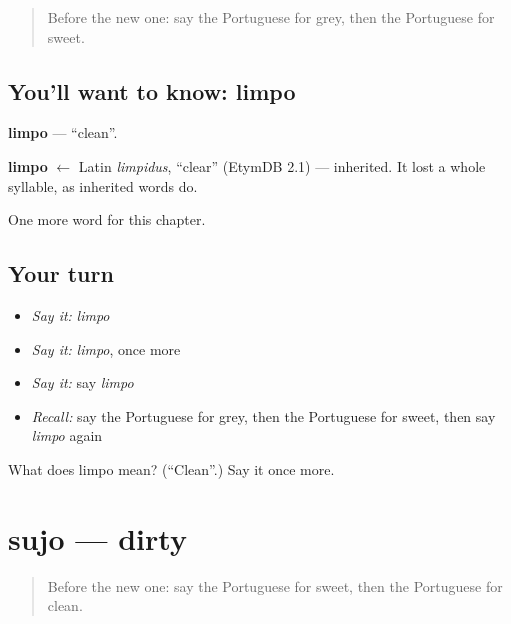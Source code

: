 \label{lesson:PT-C69-limpo}



\begin{quote}
Before the new one: say the Portuguese for grey, then the Portuguese for sweet.
\end{quote}

\subsection*{You'll want to know: limpo}
\textbf{limpo} — \textquotedblleft{}clean\textquotedblright{}.

\begin{cousinweb}
\textbf{limpo} $\leftarrow$ Latin \emph{limpidus}, \textquotedblleft{}clear\textquotedblright{} (EtymDB 2.1) — inherited. It lost a whole syllable, as inherited words do.
\end{cousinweb}

\begin{grammarlens}[title={What you've built}]
One more word for this chapter.
\end{grammarlens}

\subsection*{Your turn}
\begin{itemize}
\raggedright
  \item \emph{Say it:} \emph{limpo}
  \item \emph{Say it:} \emph{limpo}, once more
  \item \emph{Say it:} say \emph{limpo}
  \item \emph{Recall:} say the Portuguese for grey, then the Portuguese for sweet, then say \emph{limpo} again
\end{itemize}

\begin{tcolorbox}[breakable,colback=teal!4,colframe=teal!35!black,title={Before you move on}]
What does limpo mean? (\textquotedblleft{}Clean\textquotedblright{}.) Say it once more.
\end{tcolorbox}
\section[sujo]{sujo — dirty}

\label{lesson:PT-C69-sujo}



\begin{quote}
Before the new one: say the Portuguese for sweet, then the Portuguese for clean.
\end{quote}

